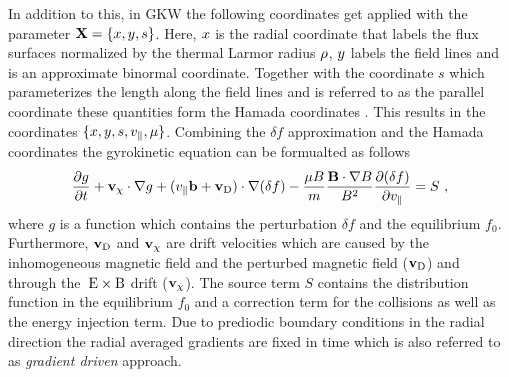 In addition to this, in GKW the following coordinates get applied with the parameter $\boldsymbol{\mathbf{X}} = \{x, y, s\}$. Here, $x$ is the radial coordinate that labels the flux surfaces normalized by the thermal Larmor radius $\rho$, $y$ labels the field lines and is an approximate binormal coordinate. Together with the coordinate $s$ which parameterizes the length along the field lines and is referred to as the parallel coordinate these quantities form the Hamada coordinates \cite{Hamada1958}. This results in the coordinates $\{x, y, s, v_\parallel, \mu\}$. Combining the $\delta f$ approximation and the Hamada coordinates the gyrokinetic equation can be formualted as follows
\begin{gather}
	\frac{\partial g}{\partial t} + \boldsymbol{\mathbf{v}}_\chi \cdot \nabla g + (v_\parallel \boldsymbol{\mathbf{b}} + \boldsymbol{\mathbf{v}}_\mathrm{D}) \cdot \nabla(\delta f) - \frac{\mu B}{m}\frac{\boldsymbol{\mathbf{B}}\cdot\nabla B}{B^2}\frac{\partial (\delta f)}{\partial v_\parallel} = S~,
\end{gather}
where $g$ is a function which contains the perturbation $\delta f$ and the equilibrium $f_0$. Furthermore, $\boldsymbol{\mathbf{v}}_\mathrm{D}$ and $\boldsymbol{\mathbf{v}}_\chi$ are drift velocities which are caused by the inhomogeneous magnetic field and the perturbed magnetic field ($\boldsymbol{\mathbf{v}}_\mathrm{D}$) and through the $\mathrm{\:E}\times\mathrm{B}$ drift ($\boldsymbol{\mathbf{v}}_\chi$). The source term $S$ contains the distribution function in the equilibrium $f_0$ and a correction term for the collisions as well as the energy injection term. Due to prediodic boundary conditions in the radial direction the radial averaged gradients are fixed in time which is also referred to as \textit{gradient driven} approach. \cite{Peeters2009}